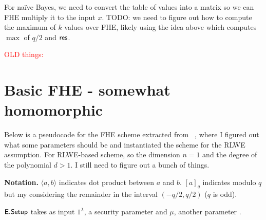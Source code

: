 \documentclass[11pt]{article}
\begin{document}
For na\"ive Bayes, we need to convert the table of values into a matrix so we can FHE multiply it to the input $x$. TODO: we need to figure out how to compute the maximum of $k$ values over FHE, likely using the idea above which computes $\max$ of $q/2$ and $\mathsf{res}$.



\newpage

\textcolor{red}{OLD things:}

\section{Basic FHE - somewhat homomorphic}



Below is a pseudocode for the FHE scheme extracted from ~\cite{BGV12}, where I figured out what some parameters should be and instantiated the scheme for the RLWE assumption.
For RLWE-based scheme, so the dimension $n=1$ and the degree of the polynomial $d>1$. I still need to figure out a bunch of things.


\textbf{Notation.} $\langle a, b \rangle$ indicates dot product between $a$ and $b$.  $[a]_q$ indicates modulo $q$ but my considering the remainder in the interval $(-q/2, q/2)$ ($q$ is odd).


$\mathsf{E.Setup}$ takes as input $1^\lambda$, a security parameter and $\mu$, another parameter .



\end{document}
